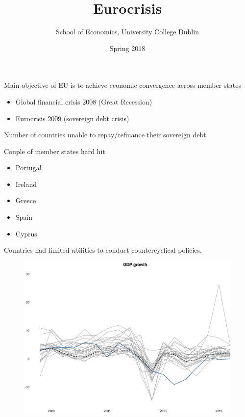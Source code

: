 \documentclass{beamer}
\title{Eurocrisis}
\author{School of Economics, University College Dublin}
\date{Spring 2018}
\begin{document}
\begin{frame}
 \titlepage
\end{frame}

\begin{frame}
 Main objective of EU is to achieve economic convergence across member states
 \begin{itemize}
   \item Global financial crisis 2008 (Great Recession)
   \item Eurocrisis 2009 (sovereign debt crisis)
 \end{itemize}
 \medskip
 Number of countries unable to repay/refinance their sovereign debt
\end{frame}

\begin{frame}
  Couple of member states hard hit
  \begin{itemize}
    \item Portugal
    \item Ireland
    \item Greece
    \item Spain
    \medskip
    \item Cyprus
  \end{itemize}
  \medskip
  Countries had limited abilities to conduct countercyclical policies.
\end{frame}

\begin{frame}
  \begin{figure}
    \includegraphics[scale=.3]{gdp_growth.eps}
  \end{figure}
\end{frame}
\end{document}
